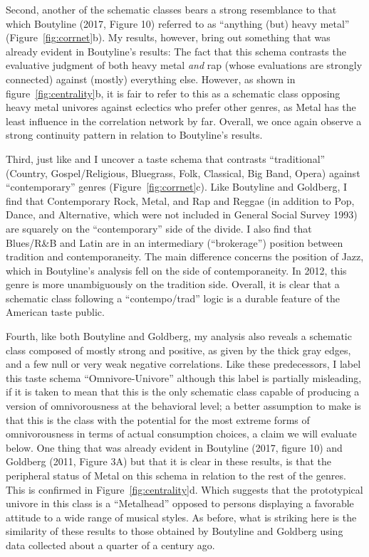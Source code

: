 \documentclass[preprint, authoryear,11pt, 3p]{elsarticle}
\begin{document}
Second, another of the schematic classes bears a strong resemblance to that which Boutyline (2017, Figure 10) referred to as ``anything (but) heavy metal'' (Figure~\ref{fig:corrnet}b). My results, however, bring out something that was already evident in Boutyline's results: The fact that this schema contrasts the evaluative judgment of both heavy metal {\em and} rap (whose evaluations are strongly connected) against (mostly) everything else. However, as shown in figure~\ref{fig:centrality}b, it is fair to refer to this as a schematic class opposing heavy metal univores against eclectics who prefer other genres, as Metal has the least influence in the correlation network by far. Overall, we once again observe a strong continuity pattern in relation to Boutyline's results.  

Third, just like \citet{boutyline2017improving} and \citet{goldberg2011mapping} I uncover a taste schema that contrasts ``traditional'' (Country, Gospel/Religious, Bluegrass, Folk, Classical, Big Band, Opera) against ``contemporary'' genres (Figure~\ref{fig:corrnet}c). Like Boutyline and Goldberg, I find that Contemporary Rock, Metal, and Rap and Reggae (in addition to Pop, Dance, and Alternative, which were not included in General Social Survey 1993) are squarely on the ``contemporary'' side of the divide. I also find that Blues/R\&B and Latin are in an intermediary (``brokerage'') position between tradition and contemporaneity. The main difference concerns the position of Jazz, which in Boutyline's analysis fell on the side of contemporaneity. In 2012, this genre is more unambiguously on the tradition side. Overall, it is clear that a schematic class following a ``contempo/trad'' logic is a durable feature of the American taste public. 

Fourth, like both Boutyline and Goldberg, my analysis also reveals a schematic class composed of mostly strong and positive, as given by the thick gray edges, and a few null or very weak negative correlations. Like these predecessors, I label this taste schema ``Omnivore-Univore'' although this label is partially misleading, if it is taken to mean that this is the only schematic class capable of producing a version of omnivorousness at the behavioral level; a better assumption to make is that this is the class with the potential for the most extreme forms of omnivorousness in terms of actual consumption choices, a claim we will evaluate below. One thing that was already evident in Boutyline (2017, figure 10) and Goldberg (2011, Figure 3A) but that it is clear in these results, is that the peripheral status of Metal on this schema in relation to the rest of the genres. This is confirmed in Figure~\ref{fig:centrality}d. Which suggests that the prototypical univore in this class is a ``Metalhead'' opposed to persons displaying a favorable attitude to a wide range of musical styles. As before, what is striking here is the similarity of these results to those obtained by Boutyline and Goldberg using data collected about a quarter of a century ago. 
\end{document}
